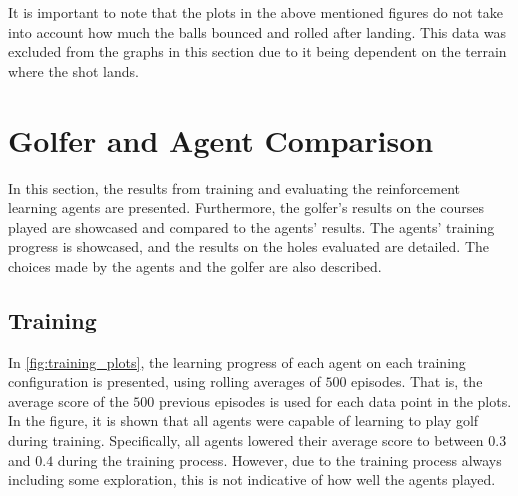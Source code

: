 \documentclass{kththesis}
\begin{document}
It is important to note that the plots in the above mentioned figures do not take into account how much the balls bounced and rolled after landing. This data was excluded from the graphs in this section due to it being dependent on the terrain where the shot lands.

\section{Golfer and Agent Comparison}
In this section, the results from training and evaluating the reinforcement learning agents are presented. Furthermore, the golfer's results on the courses played are showcased and compared to the agents' results. The agents' training progress is showcased, and the results on the holes evaluated are detailed. The choices made by the agents and the golfer are also described.

\subsection{Training}
In \autoref{fig:training_plots}, the learning progress of each agent on each training configuration is presented, using rolling averages of $500$ episodes. That is, the average score of the $500$ previous episodes is used for each data point in the plots. In the figure, it is shown that all agents were capable of learning to play golf during training. Specifically, all agents lowered their average score to between $0.3$ and $0.4$ during the training process. However, due to the training process always including some exploration, this is not indicative of how well the agents played.
\end{document}

